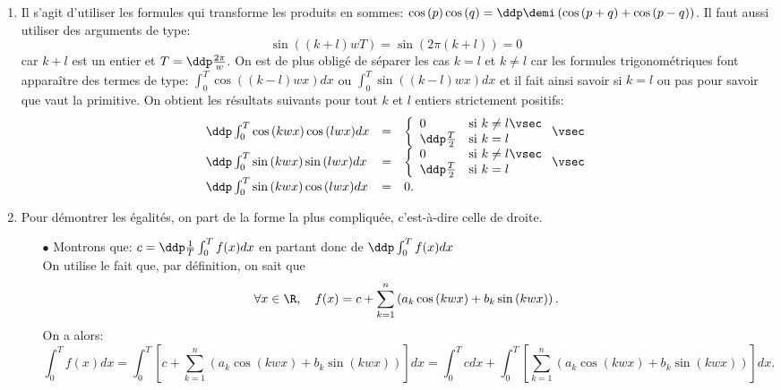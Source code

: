 \documentclass[a4paper, 11pt,reqno]{article}
\begin{document}
\begin{correction}\;
	\begin{enumerate}
		\item Il s'agit d'utiliser les formules qui transforme les produits en sommes: $\cos{(p)}\cos{(q)}=\ddp\demi\left(\cos{(p+q)}+\cos{(p-q)}  \right)$.
		      Il faut aussi utiliser des arguments de type:
		      $$\sin{((k+l)wT)}=\sin{( 2\pi(k+l) )}=0$$
		      car $k+l$ est un entier et $T=\ddp\frac{2\pi}{w}$. On est de plus oblig\'e de s\'eparer les cas $k=l$ et $k\not= l$ car les formules trigonom\'etriques font appara\^itre des termes de type: $\int_{0}^T \cos{( (k-l)wx  )} dx$ ou $\int_{0}^T \sin{( (k-l)wx  )} dx$ et il fait ainsi savoir si $k=l$ ou pas pour savoir que vaut la primitive. On obtient les r\'esultats suivants pour tout $k$ et $l$ entiers strictement positifs:
		      $$\begin{array}{lll}
				      \ddp\int_0^T \cos{(kwx)}\cos{(lwx)}dx & = & \left\lbrace\begin{array}{ll} 0 & \hbox{si}\ k\not= l\vsec\\ \ddp\frac{T}{2} & \hbox{si}\ k= l \end{array}\right.\vsec \\
				      \ddp\int_0^T \sin{(kwx)}\sin{(lwx)}dx & = & \left\lbrace\begin{array}{ll} 0 & \hbox{si}\ k\not= l\vsec\\ \ddp\frac{T}{2} & \hbox{si}\ k= l \end{array}\right.\vsec \\
				      \ddp\int_0^T \sin{(kwx)}\cos{(lwx)}dx & = & 0.
			      \end{array}$$
		\item Pour d\'emontrer les \'egalit\'es, on part de la forme la plus compliqu\'ee, c'est-\`a-dire celle de droite.
		      \begin{itemize}
			      \item[$\bullet$] Montrons que: $c= \ddp\frac{1}{T} \int_0^T f(x)dx$ en partant donc de $\ddp\int_0^T f(x)dx$\\
			            On utilise le fait que, par d\'efinition, on sait que
			            $$\forall x\in\R,\quad f(x)=c+\sum\limits_{k=1}^n \left( a_k\cos{(kwx)} + b_k\sin{(kwx)}  \right).$$
			            On a alors:
			            $$\int_0^T f(x)dx =\int_0^T \left\lbrack c+\sum\limits_{k=1}^n \left( a_k\cos{(kwx)} + b_k\sin{(kwx)}  \right)    \right\rbrack dx=  \int_0^T c dx+ \int_0^T \left\lbrack \sum\limits_{k=1}^n \left( a_k\cos{(kwx)} + b_k\sin{(kwx)}  \right)    \right\rbrack dx .$$

\end{itemize}
\end{enumerate}
\end{correction}
\end{document}
